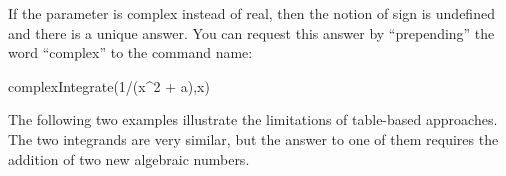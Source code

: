 {{{{{{{{\begin{xtc}
\begin{xtccomment}
If the parameter is complex instead of real, then the notion of sign is
undefined and there is a unique answer.
You can request this answer by ``prepending'' the word ``complex'' to the
command name:
\end{xtccomment}
\begin{spadsrc}
complexIntegrate(1/(x^2 + a),x)
\end{spadsrc}
\begin{TeXOutput}
\begin{fricasmath}{3}
%
\end{fricasmath}
\end{TeXOutput}
\end{xtc}

The following two examples illustrate the limitations of
table-based approaches.
The two integrands are very similar, but the answer to one of them
requires the addition of two new algebraic numbers.

}}}}}}}}
